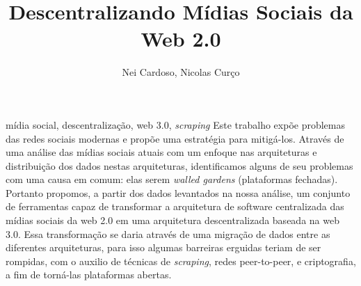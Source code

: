 \documentclass[portuguese,oneside]{tcc}
\author{Nei Cardoso, Nicolas Curço}
\title{Descentralizando Mídias Sociais da Web 2.0}
      {Decentralizing Web 2.0 Social Media}
\begin{document}







\begin{resumo}{mídia social, descentralização, web 3.0, \textit{scraping}}
Este trabalho expõe problemas das redes sociais modernas e propõe uma estratégia para mitigá-los.
Através de uma análise das mídias sociais atuais com um enfoque nas arquiteturas e distribuição dos dados nestas arquiteturas, identificamos alguns de seu problemas com uma causa em comum: elas serem \textit{walled gardens} (plataformas fechadas).
Portanto propomos, a partir dos dados levantados na nossa análise, um conjunto de ferramentas capaz de transformar a arquitetura de software centralizada das mídias sociais da web 2.0 em uma arquitetura descentralizada baseada na web 3.0.
Essa transformação se daria através de uma migração de dados entre as diferentes arquiteturas, para isso algumas barreiras erguidas teriam de ser rompidas, com o auxilio de técnicas de \textit{scraping}, redes peer-to-peer, e criptografia, a fim de torná-las plataformas abertas.
\end{resumo}
\end{document}
